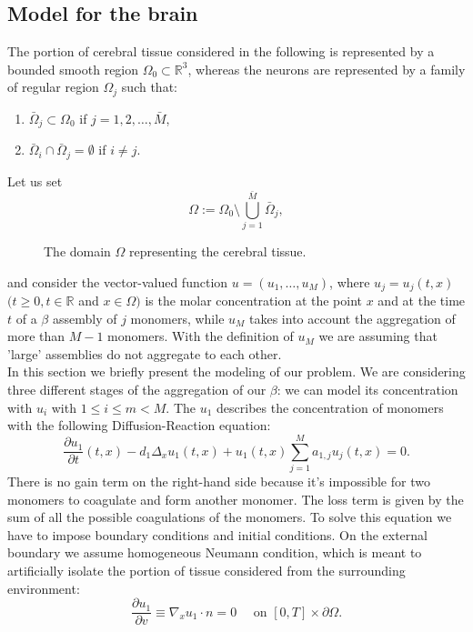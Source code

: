 \subsection{Model for the brain}
The portion of cerebral tissue considered  in the following is represented by a bounded smooth region $\Omega_{0}\subset \mathbb{R}^3$, whereas the neurons are represented by a family of regular region $\Omega_{j}$ such that:
\begin{enumerate}[label=(\roman*)]
    \item $\bar\Omega_{j}\subset \Omega_{0}$  if   $j=1,2,\dots,\bar{M}$,
    \item $\bar\Omega_{i}\cap \bar\Omega_{j}= \emptyset$  if $i\neq j$.
\end{enumerate}
Let us set 
$$
\Omega := \Omega_{0} \setminus
\bigcup_{j=1}^{\bar M} \bar\Omega_{j},
$$
\begin{figure}[H]
    \centering
    \caption{The domain $\Omega$ representing the cerebral tissue.}
    \label{fig:domain}
  \end{figure}
\noindent and consider the vector-valued function $u=(u_1,\dots, u_M)$, where $u_j=u_j(t,x)$ $(t\geq 0, t\in \mathbb{R}$ and $x\in \Omega)$ is the molar concentration at the point $x$ and at the time $t$ of a \(\beta\) assembly of $j$ monomers, while $u_M$ takes into account the aggregation of more than $M-1$ monomers. With the definition of $u_M$ we are assuming that 'large' assemblies do not aggregate to each other.\\
In this section we briefly present the modeling of our problem. We are considering three different stages of the aggregation of our \(\beta\): we can model its concentration with $u_{i}$ with $1\leq i \leq m < M$.
The $u_{1}$ describes the concentration of monomers with the following Diffusion-Reaction equation: 
$$
\frac{\partial u_{1}}{\partial t}(t, x)-d_{1} \Delta_{x} u_{1}(t, x)+u_{1}(t, x) \sum_{j=1}^{M} a_{1, j} u_{j}(t, x)=0.
$$
There is no gain term on the right-hand side because it's impossible for two monomers to coagulate and form another monomer. The loss term is given by the sum of all the possible coagulations of the monomers. 
To solve this equation we have to impose boundary conditions and initial conditions.
On the external boundary we assume homogeneous Neumann condition, which is meant to artificially isolate the portion of tissue considered from the surrounding environment:
$$
\frac{\partial u_1}{\partial v} \equiv \nabla_{x} u_1\cdot n=0 \quad \text { on }[0, T] \times \partial \Omega.$$
